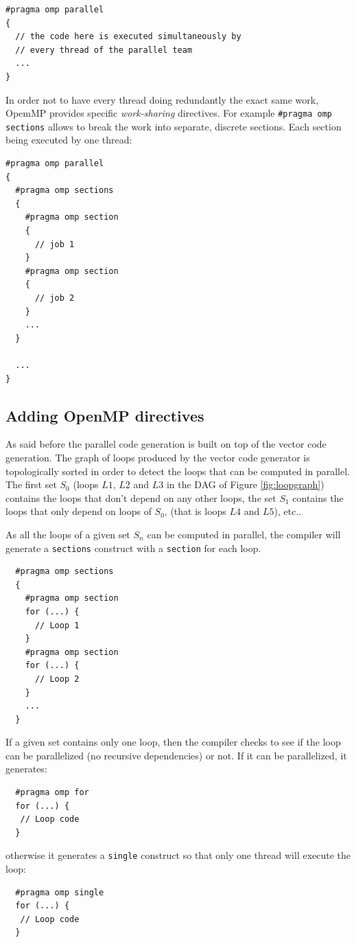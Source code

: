 \documentclass[a4paper,10pt]{book}
\begin{document}
\begin{lstlisting}
#pragma omp parallel
{
  // the code here is executed simultaneously by 
  // every thread of the parallel team
  ...
}
\end{lstlisting}

In order not to have every thread doing redundantly the exact same work, OpemMP provides specific \textit{work-sharing} directives. For example \lstinline!#pragma omp sections! allows to break the work into separate, discrete sections. Each section being executed by one thread:

\begin{lstlisting}
#pragma omp parallel
{
  #pragma omp sections
  {
    #pragma omp section
    {
      // job 1
    }
    #pragma omp section
    {
      // job 2
    }
    ...
  }

  ...
}
\end{lstlisting}

\subsection{Adding OpenMP directives}
As said before the parallel code generation is built on top of the vector code generation. The graph of loops produced by the vector code generator is topologically sorted in order to detect the loops that can be computed in parallel. The first set $S_0$ (loops $L1$, $L2$ and $L3$ in the DAG of Figure \ref{fig:loopgraph}) contains the loops that don't depend on any other loops, the set $S_1$ contains the loops that only depend on loops of $S_0$, (that is loops $L4$ and $L5$), etc.. 

As all the loops of a given set $S_n$ can be computed in parallel, the compiler will generate a \lstinline!sections! construct with a \lstinline!section! for each loop. 
\begin{lstlisting}
  #pragma omp sections
  {
    #pragma omp section
    for (...) {
      // Loop 1
    }
    #pragma omp section
    for (...) {
      // Loop 2
    }
    ...
  }
\end{lstlisting}
 
If a given set contains only one loop, then the compiler checks to see if the loop can be parallelized (no recursive dependencies) or not. If it can be parallelized, it generates:
\begin{lstlisting}
  #pragma omp for
  for (...) {
   // Loop code
  }
\end{lstlisting}
otherwise it generates a \lstinline!single! construct so that only one thread will execute the loop:
\begin{lstlisting}
  #pragma omp single
  for (...) {
   // Loop code
  }
\end{lstlisting}
\end{document}
